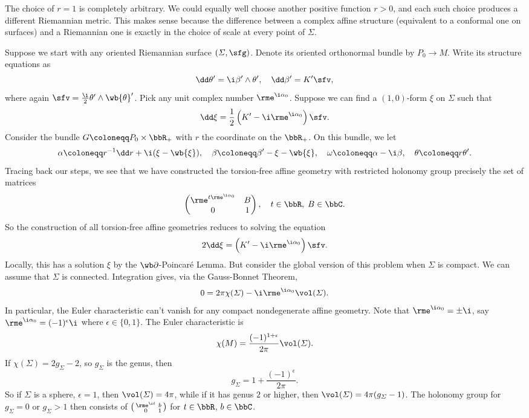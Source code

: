 \begin{rem}
    The choice of $r=1$ is completely arbitrary. We could equally well choose another positive function $r>0$, and each such choice produces a different Riemannian metric. This makes sense because the difference between a complex affine structure (equivalent to a conformal one on surfaces) and a Riemannian one is exactly in the choice of scale at every point of $\varSigma$.
\end{rem}

Suppose we start with any oriented Riemannian surface $(\varSigma,\sfg)$. Denote its oriented orthonormal bundle by $P_0\to M$. Write its structure equations as 
\[\dd\theta'=\i\beta'\wedge\theta',\quad \dd\beta'=K'\sfv,\]
where again $\sfv=\frac{\i}{2}\theta'\wedge\wb{\theta}'$. Pick any unit complex number $\rme^{\i \alpha_0}$. Suppose we can find a $(1,0)$-form $\xi$ on $\varSigma$ such that 
\[\dd\xi=\frac{1}{2}\left(K'-\i\rme^{\i\alpha_0}\right)\sfv.\]
Consider the bundle $G\coloneqq P_0\times\bbR_+$ with $r$ the coordinate on the $\bbR_+$. On this bundle, we let 
\[\alpha\coloneqq r^{-1}\dd r+\i(\xi-\wb{\xi}),\quad \beta\coloneqq \beta'-\xi-\wb{\xi},\quad \omega\coloneqq \alpha-\i\beta,\quad \theta\coloneqq r\theta'.\]
Tracing back our steps, we see that we have constructed the torsion-free affine geometry with restricted holonomy group  precisely the set of matrices 
\[\begin{pmatrix}
    \rme^{t\rme^{\i\alpha_0}} & B\\ 0 & 1
\end{pmatrix},\quad t\in\bbR,\; B\in\bbC.\]
So the construction of all torsion-free affine geometries reduces to solving the equation 
\[2\dd\xi=\left(K'-\i\rme^{\i\alpha_0}\right)\sfv.\]
Locally, this has a solution $\xi$ by the $\wb\partial$-Poincar\'e Lemma. But consider the global version of this problem when $\varSigma$ is compact. We can assume that $\varSigma$ is connected. Integration gives, via the Gauss-Bonnet Theorem,
\[0=2\pi \chi(\varSigma)-\i \rme^{\i\alpha_0}\vol(\varSigma).\]
In particular, the Euler characteristic can't vanish for any compact nondegenerate affine geometry. Note that $\rme^{\i \alpha_0}=\pm \i$, say $\rme^{\i\alpha_0}=(-1)^\epsilon \i$ where $\epsilon\in \{0,1\}$. The Euler characteristic is 
\[\chi(M)=\frac{(-1)^{1+\epsilon}}{2\pi}\vol(\varSigma).\]
If $\chi(\varSigma)=2g_\varSigma-2$, so $g_\varSigma$ is the genus, then 
\[g_\varSigma=1+\frac{(-1)^\epsilon}{2\pi}.\]
So if $\varSigma$ is a sphere, $\epsilon=1$, then $\vol(\varSigma)=4\pi$, while if it has genus $2$ or higher, then $\vol(\varSigma)=4\pi(g_\varSigma-1)$. The holonomy group for $g_\varSigma=0$ or $g_\varSigma>1$ then consists of $\left(\begin{smallmatrix}
    \rme^{\i t} & b\\ 0 & 1
\end{smallmatrix}\right)$ for $t\in \bbR$, $b\in\bbC$.


